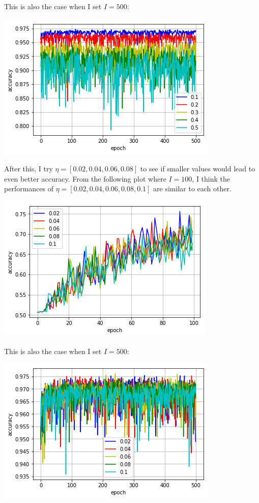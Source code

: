\documentclass[paper=letter, fontsize=12pt]{article}
\begin{document}
\begin{enumerate}
\begin{enumerate}
	This is also the case when I set $I = 500$:
	
	\includegraphics[scale=0.5]{p2q2b3.png}
	
	After this, I try $\eta = [0.02, 0.04, 0.06, 0.08]$ to see if smaller values would lead to even better accuracy. From the following plot where $I = 100$, I think the performances of $\eta = [0.02, 0.04, 0.06, 0.08, 0.1]$ are similar to each other.
	
	\includegraphics[scale=0.5]{p2q2b2.png}
	
	This is also the case when I set $I = 500$:
	
	\includegraphics[scale=0.5]{p2q2b4.png}
	

\end{enumerate}
\end{enumerate}
\end{document}
